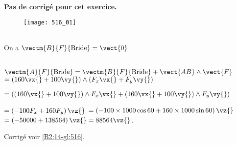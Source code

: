 \normaltrue \difficilefalse \tdifficilefalse
\correctiontrue 


\setcounter{question}{0}
\ifcorrection
\else
\textbf{Pas de corrigé pour cet exercice.}
\fi

\ifprof
\else


\begin{figure}[H]
\centering
\texttt{[image: 516\_01]}
\end{figure}
\fi


\ifprof ~\\
On a $\vectm{B}{F}{\text{Bride}} = \vect{0}$
\else
\fi

\ifprof ~\\
$\vectm{A}{F}{\text{Bride}}=\vectm{B}{F}{\text{Bride}} + \vect{AB}\wedge \vect{F} $ 
$=\left(160 \vx{} + 100 \vy{}\right) \wedge \left(F_x \vx{}+F_y \vy{} \right) $

$= \left(\left(160 \vx{} + 100 \vy{}\right) \wedge  F_x \vx{}+ \left(160 \vx{} + 100 \vy{}\right) \wedge F_y \vy{} \right) $

$= \left( -100 F_x +  160  F_y   \right)\vz{} $
$= \left( -100 \times 1000 \cos 60 +  160   \times 1000 \sin 60 \right)\vz{} $
$= \left( - 50000 +  138 564 \right)\vz{} =  88 564 \vz{} $.
\else
\fi


\ifprof
\else
\begin{flushright}
\footnotesize{Corrigé  voir \ref{B2:14-gl:516}.}
\end{flushright}%
\fi